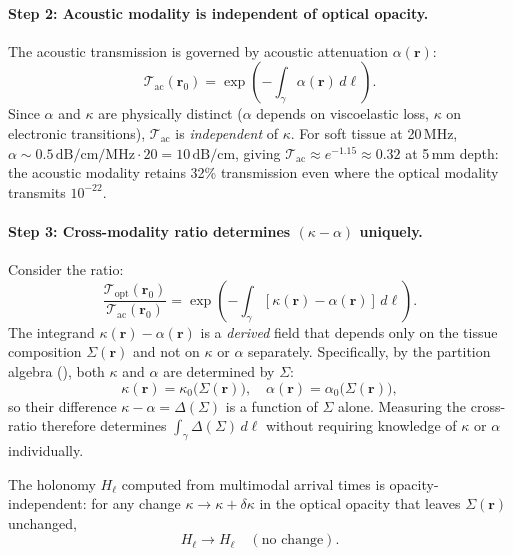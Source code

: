 \paragraph{Step 2: Acoustic modality is independent of optical opacity.}
The acoustic transmission is governed by acoustic attenuation $\alpha(\mathbf{r})$:
\begin{equation}
  \mathcal{T}_\text{ac}(\mathbf{r}_0)
  = \exp\!\left(-\int_\gamma \alpha(\mathbf{r})\,d\ell\right).
  \label{eq:ch06-acoustic-transmission}
\end{equation}
Since $\alpha$ and $\kappa$ are physically distinct ($\alpha$ depends on
viscoelastic loss, $\kappa$ on electronic transitions), $\mathcal{T}_\text{ac}$
is \emph{independent} of $\kappa$.  For soft tissue at 20\,MHz,
$\alpha \sim 0.5\,\text{dB/cm/MHz} \cdot 20 = 10\,\text{dB/cm}$, giving
$\mathcal{T}_\text{ac} \approx e^{-1.15} \approx 0.32$ at 5\,mm depth: the
acoustic modality retains 32\% transmission even where the optical modality
transmits $10^{-22}$.

\paragraph{Step 3: Cross-modality ratio determines $(\kappa - \alpha)$ uniquely.}
Consider the ratio:
\begin{equation}
  \frac{\mathcal{T}_\text{opt}(\mathbf{r}_0)}{\mathcal{T}_\text{ac}(\mathbf{r}_0)}
  = \exp\!\left(-\int_\gamma [\kappa(\mathbf{r}) - \alpha(\mathbf{r})]\,d\ell\right).
  \label{eq:ch06-cross-ratio}
\end{equation}
The integrand $\kappa(\mathbf{r}) - \alpha(\mathbf{r})$ is a \emph{derived}
field that depends only on the tissue composition $\Sigma(\mathbf{r})$ and
not on $\kappa$ or $\alpha$ separately.  Specifically, by the partition
algebra (), both $\kappa$ and $\alpha$ are
determined by $\Sigma$:
\[
  \kappa(\mathbf{r}) = \kappa_0\bigl(\Sigma(\mathbf{r})\bigr), \quad
  \alpha(\mathbf{r}) = \alpha_0\bigl(\Sigma(\mathbf{r})\bigr),
\]
so their difference $\kappa - \alpha = \Delta(\Sigma)$ is a function of
$\Sigma$ alone.  Measuring the cross-ratio 
therefore determines $\int_\gamma \Delta(\Sigma)\,d\ell$ without requiring
knowledge of $\kappa$ or $\alpha$ individually.

\begin{theorem}
\label{thm:ch06-holonomy-opacity}
The holonomy $H_\ell$ computed from multimodal arrival times is
opacity-independent: for any change $\kappa \to \kappa + \delta\kappa$ in
the optical opacity that leaves $\Sigma(\mathbf{r})$ unchanged,
\[
  H_\ell \to H_\ell \quad (\text{no change}).
\]
\end{theorem}

